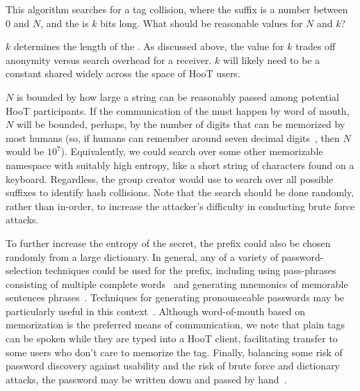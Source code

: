 %
This algorithm searches for a tag collision, where the  suffix is
a number between 0 and $N$, and the  is $k$ bits long.
What should be reasonable values for $N$ and $k$?

$k$ determines the length of the . As discussed above, the value for $k$
trades off anonymity versus search overhead for a receiver. $k$ will likely need to be
a constant shared widely across the space of HooT users.

$N$ is bounded by how large a  string can be reasonably
passed among potential HooT participants. If the communication of the
 must happen by word of mouth, $N$ will be bounded,
perhaps, by the number of digits that can be memorized by most humans
(so, if humans can remember around seven decimal
digits~\cite{miller56}, then $N$ would be $10^7$). Equivalently, we
could search over some other memorizable namespace with suitably high
entropy, like a short string of characters found on a keyboard.
Regardless, the group creator would use  to search over all possible suffixes to
identify hash collisions. Note that the search should be done
randomly, rather than in-order, to increase the attacker's difficulty
in conducting brute force attacks. 

To further increase the entropy of the secret, the prefix could also be
chosen randomly from a large dictionary. In general, any of a variety of
password-selection techniques could be used for the prefix, including
using pass-phrases consisting of multiple complete
words~\cite{passphrase} and generating mnemonics of memorable sentences
phrases~\cite{mnemonics}. Techniques for generating pronounceable
passwords may be particularly useful in this
context~\cite{gasser}. Although word-of-mouth based on memorization is
the preferred means of communication, we note that plain tags can be
spoken while they are typed into a HooT client, facilitating transfer to
some users who don't care to memorize the tag. Finally, balancing some
risk of password discovery against usability and the risk of brute force
and dictionary attacks, the password may be written down and passed by
hand~\cite{written-passwords}.

